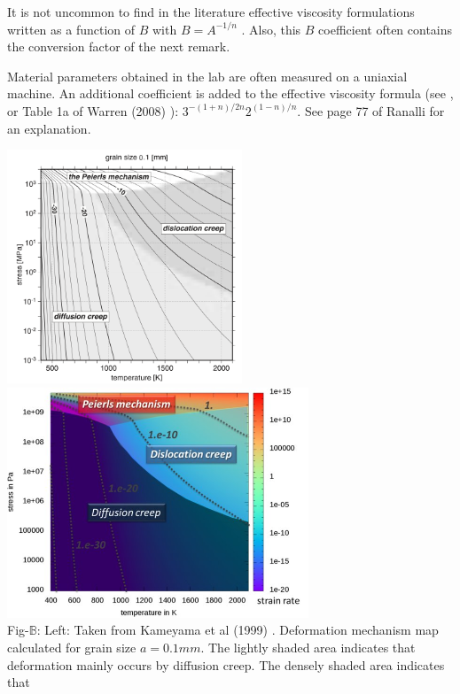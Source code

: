 \begin{remark}
It is not uncommon to find in the literature effective viscosity formulations written as a function 
of $B$ with $B=A^{-1/n}$ \cite{wabj08,wabj08b,wabj08c}. Also, this $B$ coefficient often contains the conversion 
factor of the next remark.
\end{remark}

\begin{remark} Material parameters obtained in the lab are often measured on a uniaxial machine. 
An additional coefficient is added to the effective viscosity formula (see \cite{grpy12,grpy13}, 
or Table 1a of Warren \etal (2008) \cite{wabj08}):
$3^{-(1+n)/2n}2^{(1-n)/n}$. See page 77 of Ranalli \cite{ranalli} for an explanation.
\end{remark}

\begin{center}
\includegraphics[width=7cm]{images/rheology/defmap}
\includegraphics[width=9cm]{images/rheology/elme18}\\
{\captionfont 
Fig-$\mathds{B}$: Left: Taken from Kameyama et al (1999) \cite{kayk99}.
Deformation mechanism map calculated for grain size $a=0.1\si{mm}$. The lightly shaded area indicates 
that deformation mainly occurs by diffusion creep. The densely shaded area indicates that 
}
\end{center}
